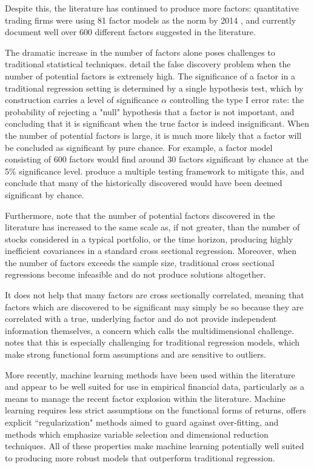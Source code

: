 \documentclass[11pt, a4paper, table]{article}
\begin{document}
Despite this, the literature has continued to produce more factors: quantitative trading firms were using 81 factor models as the norm by 2014 \citep{hsu_finding_2014}, and \cite{harvey_census_2019} currently document well over 600 different factors suggested in the literature. 

The dramatic increase in the number of factors alone poses challenges to traditional statistical techniques. \cite{harvey__2016} detail the false discovery problem when the number of potential factors is extremely high. The significance of a factor in a traditional regression setting is determined by a single hypothesis test, which by construction carries a level of significance $\alpha$ controlling the type I error rate: the probability of rejecting a "null" hypothesis that a factor is not important, and concluding that it is significant when the true factor is indeed insignificant. When the number of potential factors is large, it is much more likely that a factor will be concluded as significant by pure chance. For example, a factor model consisting of 600 factors would find around 30 factors significant by chance at the 5\% significance level. \cite{harvey__2016} produce a multiple testing framework to mitigate this, and conclude that many of the historically discovered would have been deemed significant by chance.

Furthermore, \cite{feng_taming_2019} note that the number of potential factors discovered in the literature has increased to the same scale as, if not greater, than the number of stocks considered in a typical portfolio, or the time horizon, producing highly inefficient covariances in a standard cross sectional regression. Moreover, when the number of factors exceeds the sample size, traditional cross sectional regressions become infeasible and do not produce solutions altogether. 

It does not help that many factors are cross sectionally correlated, meaning that factors which are discovered to be significant may simply be so because they are correlated with a true, underlying factor and do not provide independent information themselves, a concern which \cite{cochrane_presidential_2011} calls the multidimensional challenge. \cite{freyberger_dissecting_2017} notes that this is especially challenging for traditional regression models, which make strong functional form assumptions and are sensitive to outliers. 

More recently, machine learning methods have been used within the literature and appear to be well suited for use in empirical financial data, particularly as a means to manage the recent factor explosion within the literature. Machine learning requires less strict assumptions on the functional forms of returns, offers explicit ``regularization" methods aimed to guard against over-fitting, and methods which emphasize variable selection and dimensional reduction techniques. All of these properties make machine learning potentially well suited to producing more robust models that outperform traditional regression.
\end{document}
